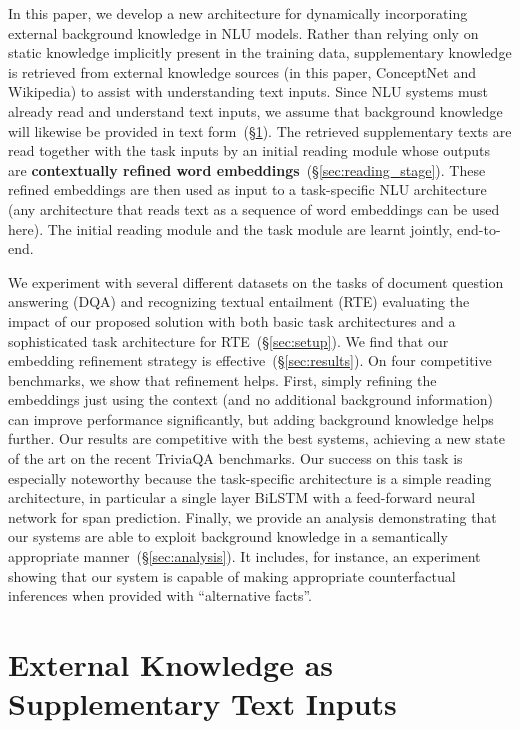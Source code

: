 \documentclass[11pt,a4paper]{article}
\begin{document}
In this paper, we develop a new architecture for dynamically incorporating external background knowledge in NLU models. Rather than relying only on static knowledge implicitly present in the training data, supplementary knowledge is retrieved from external knowledge sources (in this paper, ConceptNet and Wikipedia) to assist with understanding text inputs. Since NLU systems must already read and understand text inputs, we assume that background knowledge will likewise be provided in text form~(\S\ref{sec:external_knowledge}).
The retrieved supplementary texts are read together with the task inputs by an initial reading module whose outputs are \textbf{contextually refined word embeddings}~(\S\ref{sec:reading_stage}). These refined embeddings are then used as input to a task-specific NLU architecture (any architecture that reads text as a sequence of word embeddings can be used here). The initial reading module and the task module are learnt jointly, end-to-end.



We experiment with several different datasets on the tasks of document question answering (DQA) and recognizing textual entailment (RTE) evaluating the impact of our proposed solution with both basic task architectures and a sophisticated task architecture for RTE~(\S\ref{sec:setup}). We find that our embedding refinement strategy is effective~(\S\ref{sec:results}). On four competitive benchmarks, we show that refinement helps. First, simply refining the embeddings just using the context (and no additional background information) can improve performance significantly, but adding background knowledge helps further. Our results are competitive with the best systems, achieving a new state of the art on the recent TriviaQA benchmarks. Our success on this task is especially noteworthy because the task-specific architecture is a simple reading architecture, in particular a single layer BiLSTM with a feed-forward neural network for span prediction. Finally, we provide an analysis demonstrating that our systems are able to exploit background knowledge in a semantically appropriate manner~(\S\ref{sec:analysis}). It includes, for instance, an experiment showing that our system is capable of making appropriate counterfactual inferences when provided with ``alternative facts''.

\section{External Knowledge as Supplementary Text Inputs}\label{sec:external_knowledge}
\end{document}
